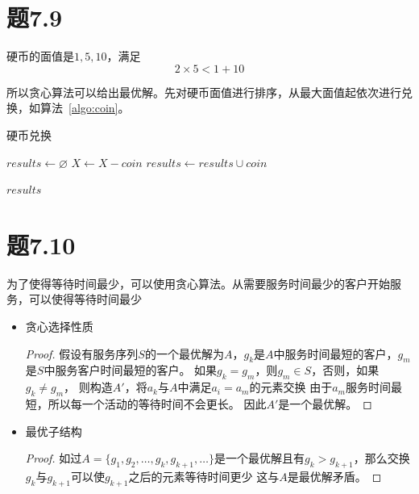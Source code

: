 \documentclass[a4paper,twoside]{article}
\begin{document}
\begin{spacing}{1.2}
\section{题7.9}

硬币的面值是$1,5,10$，满足
\[2\times 5<1+10
\]

所以贪心算法可以给出最优解。先对硬币面值进行排序，从最大面值起依次进行兑换，如算法~\ref{algo:coin}。

\begin{algorithm}
	\caption{硬币兑换}
	\label{algo:coin}
	\begin{algorithmic}[1]
		
		
		\State {}

		\State $results \gets \varnothing$
			\State $X \gets X-coin$
			\State $results \gets results \cup coin$
		\EndWhile
		\EndFor

		\State \Return $results$
		
		\EndProcedure
	\end{algorithmic}
\end{algorithm}	

\section{题7.10}

为了使得等待时间最少，可以使用贪心算法。从需要服务时间最少的客户开始服务，可以使得等待时间最少

\begin{itemize}
	\item 贪心选择性质
	\begin{proof}
		假设有服务序列$S$的一个最优解为$A$，$g_k$是$A$中服务时间最短的客户，$g_m$是$S$中服务客户时间最短的客户。
		如果\(g_k=g_m\)，则$g_m\in S$，否则，如果\(g_k \neq g_m\)，
		则构造$A'$，将$a_k$与$A$中满足$a_i=a_m$的元素交换
		由于$a_m$服务时间最短，所以每一个活动的等待时间不会更长。
		因此$A'$是一个最优解。
	\end{proof}
	\item 最优子结构
	\begin{proof}
		如过$A=\{g_1,g_2,\ldots,g_k,g_{k+1},\ldots\}$是一个最优解且有$g_k>g_{k+1}$，那么交换$g_k$与$g_{k+1}$可以使$g_{k+1}$之后的元素等待时间更少
		这与$A$是最优解矛盾。
	\end{proof}
\end{itemize}


\end{spacing}
\end{document}

